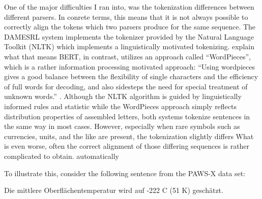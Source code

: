 One of the major difficulties I ran into, was the tokenization differences between different
parsers. In conrete terms, this means that it is not always possible to correctly align the tokens
which two parsers produce for the same sequence. %
The DAMESRL system implements the tokenizer provided by the Natural Language
Toolkit (NLTK) which implements a linguistically motivated
tokenizing. {\color{red} explain what that means}
BERT, in contrast, utilizes an approach called ``WordPieces'', which is a rather information
processing motivated approach: ``Using wordpieces gives a good balance between the flexibility
of single characters and the efficiency of full words for decoding, and also sidesteps the need
for special treatment of unknown words.'' \citep[p.~2]{wu2016google}.
Although the NLTK algorithm is guided by linguistically informed rules and statistic while the
WordPieces approach simply reflects distribution properties of assembled letters, both systems
tokenize sentences in the same way in most cases. However, especially when rare symbols such as
currencies, units, and the like are present, the tokenization slightly differs What is even
worse, often the correct alignment of those differing sequences is rather complicated to obtain.
{\color{red} automatically}


To illustrate this, consider the following sentence from the PAWS-X data set:

\begin{examples}
	\item Die mittlere Oberflächentemperatur wird auf -222 \textdegree{}C ({\selectfont\texttildelow}51 K) geschätzt.

\end{examples}

